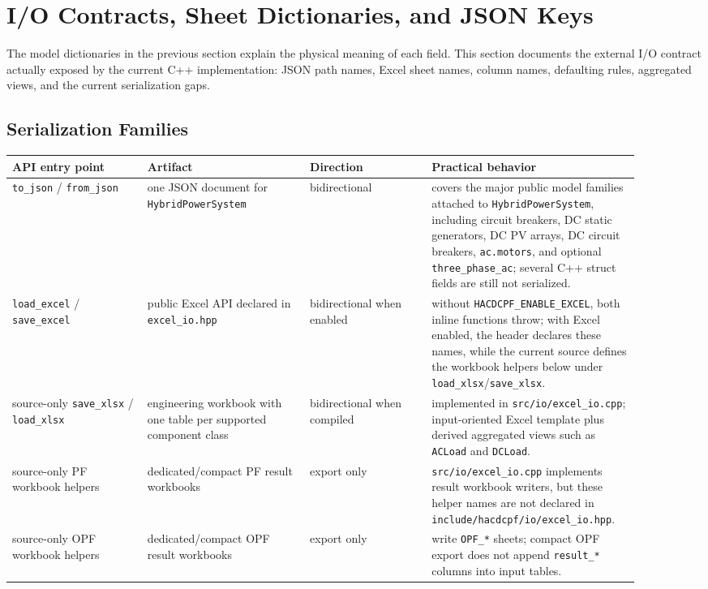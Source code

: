 \section{I/O Contracts, Sheet Dictionaries, and JSON Keys}

The model dictionaries in the previous section explain the physical meaning of
each field.  This section documents the external I/O contract actually exposed
by the current C++ implementation: JSON path names, Excel sheet names, column
names, defaulting rules, aggregated views, and the current serialization gaps.

\subsection{Serialization Families}

\begin{longtable}{L{0.20\linewidth}L{0.24\linewidth}L{0.18\linewidth}L{0.28\linewidth}}
\toprule
API entry point & Artifact & Direction & Practical behavior \\
\midrule
\endhead
\texttt{to\_json} / \texttt{from\_json} & one JSON document for \texttt{HybridPowerSystem} & bidirectional & covers the major public model families attached to \texttt{HybridPowerSystem}, including circuit breakers, DC static generators, DC PV arrays, DC circuit breakers, \texttt{ac.motors}, and optional \texttt{three\_phase\_ac}; several C++ struct fields are still not serialized. \\
\texttt{load\_excel} / \texttt{save\_excel} & public Excel API declared in \texttt{excel\_io.hpp} & bidirectional when enabled & without \texttt{HACDCPF\_ENABLE\_EXCEL}, both inline functions throw; with Excel enabled, the header declares these names, while the current source defines the workbook helpers below under \texttt{load\_xlsx}/\texttt{save\_xlsx}. \\
source-only \texttt{save\_xlsx} / \texttt{load\_xlsx} & engineering workbook with one table per supported component class & bidirectional when compiled & implemented in \texttt{src/io/excel\_io.cpp}; input-oriented Excel template plus derived aggregated views such as \texttt{ACLoad} and \texttt{DCLoad}. \\
source-only PF workbook helpers & dedicated/compact PF result workbooks & export only & \texttt{src/io/excel\_io.cpp} implements result workbook writers, but these helper names are not declared in \texttt{include/hacdcpf/io/excel\_io.hpp}. \\
source-only OPF workbook helpers & dedicated/compact OPF result workbooks & export only & write \texttt{OPF\_*} sheets; compact OPF export does not append \texttt{result\_*} columns into input tables. \\

\end{longtable}
